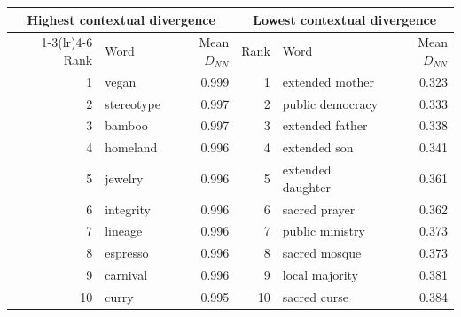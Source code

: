 \begin{tabular}{@{}r l r r l r@{}}
\toprule
\multicolumn{3}{c}{Highest contextual divergence} & \multicolumn{3}{c}{Lowest contextual divergence} \\
\cmidrule(lr){1-3}\cmidrule(lr){4-6}
Rank & Word & Mean $D_{NN}$ & Rank & Word & Mean $D_{NN}$ \\
\midrule
1 & vegan & 0.999 & 1 & extended mother & 0.323 \\
2 & stereotype & 0.997 & 2 & public democracy & 0.333 \\
3 & bamboo & 0.997 & 3 & extended father & 0.338 \\
4 & homeland & 0.996 & 4 & extended son & 0.341 \\
5 & jewelry & 0.996 & 5 & extended daughter & 0.361 \\
6 & integrity & 0.996 & 6 & sacred prayer & 0.362 \\
7 & lineage & 0.996 & 7 & public ministry & 0.373 \\
8 & espresso & 0.996 & 8 & sacred mosque & 0.373 \\
9 & carnival & 0.996 & 9 & local majority & 0.381 \\
10 & curry & 0.995 & 10 & sacred curse & 0.384 \\
\bottomrule
\end{tabular}
